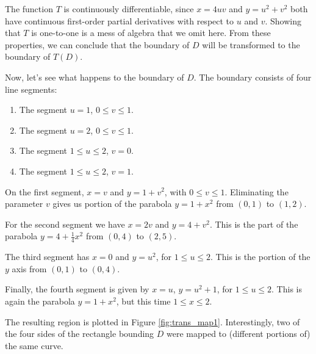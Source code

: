 {The function $T$ is continuously differentiable, since $x=4uv$ and $y=u^2+v^2$ both have continuous first-order partial derivatives with respect to $u$ and $v$. Showing that $T$ is one-to-one is a mess of algebra that we omit here. From these properties, we can conclude that the boundary of $D$ will be transformed to the boundary of $T(D)$.


Now, let's see what happens to the boundary of $D$. The boundary consists of four line segments:
\begin{enumerate}
\item The segment $u=1$, $0\leq v\leq 1$.
\item The segment $u=2$, $0\leq v\leq 1$.
\item The segment $1\leq u\leq 2$, $v=0$.
\item The segment $1\leq u\leq 2$, $v=1$.
\end{enumerate}
On the first segment, $x=v$ and $y=1+v^2$, with $0\leq v\leq 1$. Eliminating the parameter $v$ gives us portion of the parabola $y=1+x^2$ from $(0,1)$ to $(1,2)$.

For the second segment we have $x=2v$ and $y=4+v^2$. This is the part of the parabola $y=4+\frac14 x^2$ from $(0,4)$ to $(2,5)$.

The third segment has $x=0$ and $y=u^2$, for $1\leq u\leq 2$. This is the portion of the $y$ axis from $(0,1)$ to $(0,4)$.

Finally, the fourth segment is given by $x=u$, $y=u^2+1$, for $1\leq u\leq 2$. This is again the parabola $y=1+x^2$, but this time $1\leq x\leq 2$.

The resulting region is plotted in Figure \ref{fig:trans_map1}. Interestingly, two of the four sides of the rectangle bounding $D$ were mapped to (different portions of) the same curve.
}\\

